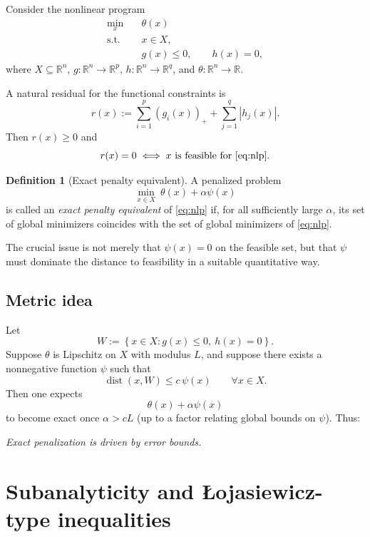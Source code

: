 \documentclass[pdflatex,sn-mathphys-num]{sn-jnl}%
\theoremstyle{definition}
\newtheorem{definition}[theorem]{Definition}
\newcommand{\R}{\mathbb{R}}
\newcommand{\dist}{\operatorname{dist}}
\newcommand{\abs}[1]{\left\lvert #1 \right\rvert}
\newcommand{\set}[1]{\left\{ #1 \right\}}
\newcommand{\pos}[1]{\left(#1\right)_{+}}
\begin{document}
Consider the nonlinear program
\begin{equation}
\label{eq:nlp}
\begin{aligned}
    \min_x\quad & \theta(x)\\
    \text{s.t.}\quad & x\in X,\\
    & g(x)\le 0,\qquad h(x)=0,
\end{aligned}
\end{equation}
where $X\subseteq \R^n$, $g:\R^n\to\R^p$, $h:\R^n\to\R^q$, and $\theta:\R^n\to\R$.

A natural residual for the functional constraints is
\begin{equation}
\label{eq:nlp-residual}
r(x):=\sum_{i=1}^p \pos{g_i(x)}+\sum_{j=1}^q \abs{h_j(x)}.
\end{equation}
Then $r(x)\ge 0$ and
\[
r(x)=0 \iff x \text{ is feasible for } \eqref{eq:nlp}.
\]

\begin{definition}[Exact penalty equivalent]
A penalized problem
\[
\min_{x\in X}\ \theta(x)+\alpha \psi(x)
\]
is called an \emph{exact penalty equivalent} of \eqref{eq:nlp} if, for all sufficiently large $\alpha$, its set of global minimizers coincides with the set of global minimizers of \eqref{eq:nlp}.
\end{definition}

The crucial issue is not merely that $\psi(x)=0$ on the feasible set, but that $\psi$ must dominate the distance to feasibility in a suitable quantitative way.

\subsection{Metric idea}

Let
\[
W:=\set{x\in X: g(x)\le 0,\ h(x)=0}.
\]
Suppose $\theta$ is Lipschitz on $X$ with modulus $L$, and suppose there exists a nonnegative function $\psi$ such that
\[
\dist(x,W)\le c\,\psi(x)\qquad \forall x\in X.
\]
Then one expects
\[
\theta(x)+\alpha \psi(x)
\]
to become exact once $\alpha > cL$ (up to a factor relating global bounds on $\psi$). Thus:

\begin{center}
\emph{Exact penalization is driven by error bounds.}
\end{center}

\section{Subanalyticity and Łojasiewicz-type inequalities}
\end{document}
